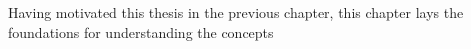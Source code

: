 Having motivated this thesis in the previous chapter, this chapter lays
the foundations for understanding the concepts
